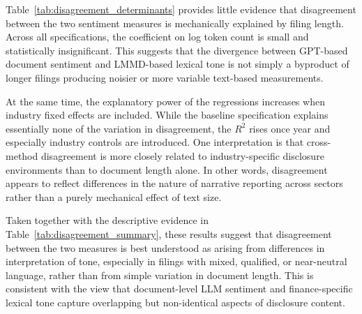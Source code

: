 Table~\ref{tab:disagreement_determinants} provides little evidence that disagreement between the two sentiment measures is mechanically explained by filing length. Across all specifications, the coefficient on log token count is small and statistically insignificant. This suggests that the divergence between GPT-based document sentiment and LMMD-based lexical tone is not simply a byproduct of longer filings producing noisier or more variable text-based measurements.

At the same time, the explanatory power of the regressions increases when industry fixed effects are included. While the baseline specification explains essentially none of the variation in disagreement, the $R^2$ rises once year and especially industry controls are introduced. One interpretation is that cross-method disagreement is more closely related to industry-specific disclosure environments than to document length alone. In other words, disagreement appears to reflect differences in the nature of narrative reporting across sectors rather than a purely mechanical effect of text size.

Taken together with the descriptive evidence in Table~\ref{tab:disagreement_summary}, these results suggest that disagreement between the two measures is best understood as arising from differences in interpretation of tone, especially in filings with mixed, qualified, or near-neutral language, rather than from simple variation in document length. This is consistent with the view that document-level LLM sentiment and finance-specific lexical tone capture overlapping but non-identical aspects of disclosure content.